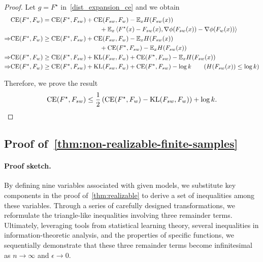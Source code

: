 \begin{proof}
Let $g=F^\star$ in~\cref{dist_expansion_ce} and we obtain
\begin{align*}
    & \cross(F^\star, F_w) = \cross(F^\star, F_{sw}) + \cross(F_{sw}, F_w) - \expect_x H(F_{sw}(x)) \\ & \hspace{5cm} + \expect_x \left \langle F^\star(x)-F_{sw}(x), \nabla \phi(F_{sw}(x)) - \nabla \phi(F_w(x)) \right \rangle
    \\ \Rightarrow & \cross(F^\star, F_w) \ge \cross(F^\star, F_{sw}) + \cross(F_{sw}, F_w) - \expect_x H(F_{sw}(x)) \\  & \hspace{5cm}  + \cross(F^\star,F_{sw}) - \expect_x H(F_{sw}(x))
    \\ \Rightarrow & \cross(F^\star, F_w) \ge \cross(F^\star, F_{sw}) + \kl(F_{sw}, F_w) + \cross(F^\star,F_{sw}) - \expect_x H(F_{sw}(x))
    \\ \Rightarrow & \cross(F^\star, F_w) \ge \cross(F^\star, F_{sw}) + \kl(F_{sw}, F_w) + \cross(F^\star,F_{sw}) - \log k \tag{$H(F_{sw}(x)) \le \log k$}
\end{align*}

Therefore, we prove the result
$$\mathrm{CE}(F^\star, F_{sw}) \le \\ \frac{1}{2}\left(\mathrm{CE}(F^\star, F_w)-\mathrm{KL}(F_{sw}, F_w)\right) + \log k.$$
\end{proof}









\subsection{Proof of~\cref{thm:non-realizable-finite-samples}} \label{proof_non-realizable}

\paragraph{Proof sketch.}
By defining nine variables associated with given models, we substitute key components in the proof of~\cref{thm:realizable} to derive a set of inequalities among these variables.
Through a series of carefully designed transformations, we reformulate the triangle-like inequalities involving three remainder terms.
Ultimately, leveraging tools from statistical learning theory, several inequalities in information-theoretic analysis, and the properties of specific functions, we sequentially demonstrate that these three remainder terms become infinitesimal as $n \to \infty$ and $\epsilon \to 0$.


